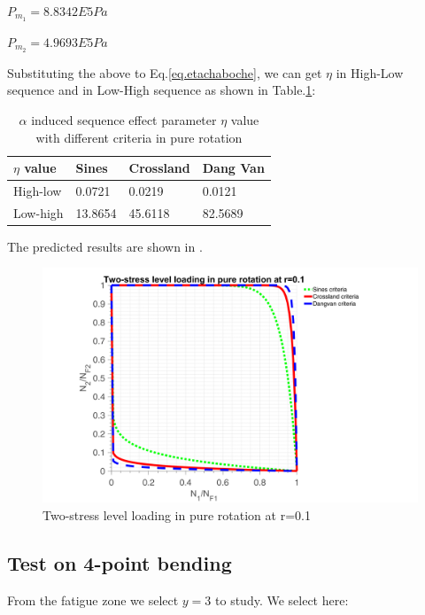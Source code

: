 \vspace{6pt}
$P_{m_1}=8.8342E5 Pa$

\vspace{6pt}
$P_{m_2}=4.9693E5 Pa$

Substituting the above to Eq.\eqref{eq.etachaboche}, we can get $\eta$ in High-Low sequence and in Low-High sequence as shown in Table.\ref{tab.etarotation}:

\begin{table}[!h]
	\centering
	\begin{tabular}{llll}
		\hline
		$\eta$ value   & Sines  & Crossland & Dang Van \\ \hline
		High-low & 0.0721 & 0.0219    & 0.0121   \\
		Low-high & 13.8654 & 45.6118   & 82.5689  \\ \hline
	\end{tabular}
	\caption{$\alpha$ induced sequence effect parameter $\eta$ value with different criteria in pure rotation}
	\label{tab.etarotation}
\end{table}

The predicted results are shown in .

\begin{figure}[h!]
	\centering
	\includegraphics[width=\textwidth]{figures//2stressR.png} 
	\caption{Two-stress level loading in pure rotation at r=0.1}
	\label{2stressR}
\end{figure}

\newpage
\subsection{Test on 4-point bending}
From the fatigue zone we select $y=3$ to study. We select here:

